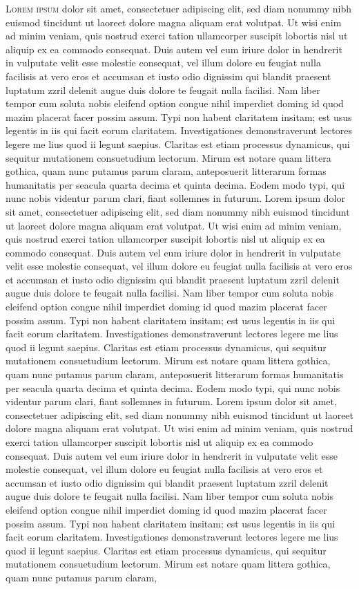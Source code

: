 \documentclass[12pt,a4paper, twoside]{report} %
\begin{document}
\lettrine{L}{orem ipsum} dolor sit amet, consectetuer adipiscing elit, sed diam nonummy nibh euismod tincidunt ut laoreet dolore magna aliquam erat volutpat. Ut wisi enim ad minim veniam, quis nostrud exerci tation ullamcorper suscipit lobortis nisl ut aliquip ex ea commodo consequat. Duis autem vel eum iriure dolor in hendrerit in vulputate velit esse molestie consequat, vel illum dolore eu feugiat nulla facilisis at vero eros et accumsan et iusto odio dignissim qui blandit praesent luptatum zzril delenit augue duis dolore te feugait nulla facilisi. Nam liber tempor cum soluta nobis eleifend option congue nihil imperdiet doming id quod mazim placerat facer possim assum. Typi non habent claritatem insitam; est usus legentis in iis qui facit eorum claritatem. Investigationes demonstraverunt lectores legere me lius quod ii legunt saepius. Claritas est etiam processus dynamicus, qui sequitur mutationem consuetudium lectorum. Mirum est notare quam littera gothica, quam nunc putamus parum claram, anteposuerit litterarum formas humanitatis per seacula quarta decima et quinta decima. Eodem modo typi, qui nunc nobis videntur parum clari, fiant sollemnes in futurum. Lorem ipsum dolor sit amet, consectetuer adipiscing elit, sed diam nonummy nibh euismod tincidunt ut laoreet dolore magna aliquam erat volutpat. Ut wisi enim ad minim veniam, quis nostrud exerci tation ullamcorper suscipit lobortis nisl ut aliquip ex ea commodo consequat. Duis autem vel eum iriure dolor in hendrerit in vulputate velit esse molestie consequat, vel illum dolore eu feugiat nulla facilisis at vero eros et accumsan et iusto odio dignissim qui blandit praesent luptatum zzril delenit augue duis dolore te feugait nulla facilisi. Nam liber tempor cum soluta nobis eleifend option congue nihil imperdiet doming id quod mazim placerat facer possim assum. Typi non habent claritatem insitam; est usus legentis in iis qui facit eorum claritatem. Investigationes demonstraverunt lectores legere me lius quod ii legunt saepius. Claritas est etiam processus dynamicus, qui sequitur mutationem consuetudium lectorum. Mirum est notare quam littera gothica, quam nunc putamus parum claram, anteposuerit litterarum formas humanitatis per seacula quarta decima et quinta decima. Eodem modo typi, qui nunc nobis videntur parum clari, fiant sollemnes in futurum. Lorem ipsum dolor sit amet, consectetuer adipiscing elit, sed diam nonummy nibh euismod tincidunt ut laoreet dolore magna aliquam erat volutpat. Ut wisi enim ad minim veniam, quis nostrud exerci tation ullamcorper suscipit lobortis nisl ut aliquip ex ea commodo consequat. Duis autem vel eum iriure dolor in hendrerit in vulputate velit esse molestie consequat, vel illum dolore eu feugiat nulla facilisis at vero eros et accumsan et iusto odio dignissim qui blandit praesent luptatum zzril delenit augue duis dolore te feugait nulla facilisi. Nam liber tempor cum soluta nobis eleifend option congue nihil imperdiet doming id quod mazim placerat facer possim assum. Typi non habent claritatem insitam; est usus legentis in iis qui facit eorum claritatem. Investigationes demonstraverunt lectores legere me lius quod ii legunt saepius. Claritas est etiam processus dynamicus, qui sequitur mutationem consuetudium lectorum. Mirum est notare quam littera gothica, quam nunc putamus parum claram, 
\end{document}
